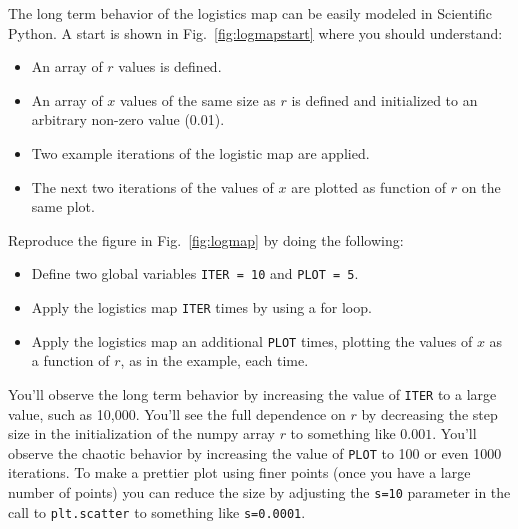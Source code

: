 The long term behavior of the logistics map can be easily modeled in Scientific Python.  A start is shown in Fig.~\ref{fig:logmapstart} where you should understand:
\begin{itemize}
\item An array of $r$ values is defined.
\item An array of $x$ values of the same size as $r$ is defined and initialized to an arbitrary non-zero value (0.01).
\item Two example iterations of the logistic map are applied.
\item The next two iterations of the values of $x$ are plotted as function of $r$ on the same plot.
\end{itemize}

\noindent
\begin{plot} \end{plot} Reproduce the figure in Fig.~\ref{fig:logmap} by doing the following:
\begin{itemize}
\item Define two global variables {\tt ITER = 10} and {\tt PLOT = 5}.
\item Apply the logistics map {\tt ITER} times by using a for loop.
\item Apply the logistics map an additional {\tt PLOT} times, plotting the values of $x$ as a function of $r$, as in the example, each time.
\end{itemize}
You'll observe the long term behavior by increasing the value of {\tt ITER} to a large value, such as 10,000.
You'll see the full dependence on $r$ by decreasing the step size in the initialization of the numpy array $r$ to something like $0.001$.  You'll observe the chaotic behavior by increasing the value of {\tt PLOT} to 100 or even 1000 iterations.  To make a prettier plot using finer points (once you have a large number of points) you can reduce the size by adjusting the {\tt s=10} parameter in the call to {\tt plt.scatter} to something like {\tt s=0.0001}.  


